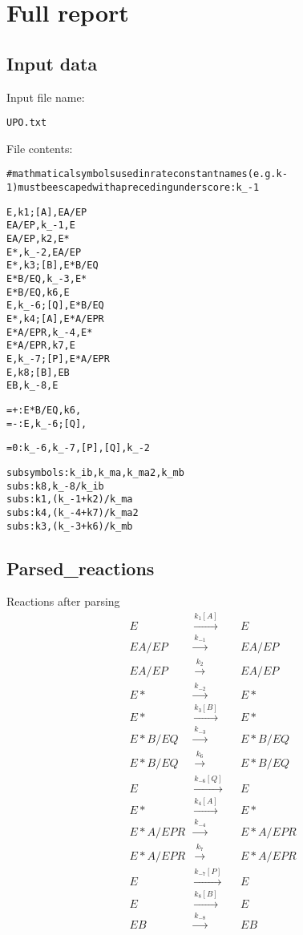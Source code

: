 \documentclass{article}%
\begin{document}
%
\normalsize%
\section{Full report}%
\label{sec:Full report}%
\subsection{Input data}%
\label{subsec:Input data}%
Input file name: %
\begin{alltt}
UPO.txt
\end{alltt}%
File contents:%
\begin{alltt}
#mathmatical symbols used in rate constant names (e.g. k-1) must be escaped with a preceding underscore: k_-1

E, k1; [A], EA/EP
EA/EP, k_-1, E
EA/EP, k2, E*
E*, k_-2, EA/EP
E*, k3; [B], E*B/EQ
E*B/EQ, k_-3, E*
E*B/EQ, k6, E
E, k_-6; [Q], E*B/EQ
E*, k4; [A], E*A/EPR
E*A/EPR, k_-4, E*
E*A/EPR, k7, E
E, k_-7; [P], E*A/EPR
E, k8; [B], EB
EB, k_-8, E

=+: E*B/EQ, k6,
=-: E, k_-6; [Q],

=0: k_-6, k_-7, [P], [Q], k_-2

subsymbols: k_ib, k_ma, k_ma2, k_mb
subs:k8, k_-8/k_ib
subs:k1, (k_-1 + k2)/k_ma
subs:k4, (k_-4+k7)/k_ma2
subs:k3, (k_-3+k6)/k_mb
\end{alltt}

%
\subsection{Parsed\_reactions}%
\label{subsec:Parsedreactions}%
Reactions after parsing \newline%
%
\begin{align*}
&E & \xrightarrow{k_{1}[A]} & &E\\
&EA/EP & \xrightarrow{k_{-1}} & &EA/EP\\
&EA/EP & \xrightarrow{k_{2}} & &EA/EP\\
&E* & \xrightarrow{k_{-2}} & &E*\\
&E* & \xrightarrow{k_{3}[B]} & &E*\\
&E*B/EQ & \xrightarrow{k_{-3}} & &E*B/EQ\\
&E*B/EQ & \xrightarrow{k_{6}} & &E*B/EQ\\
&E & \xrightarrow{k_{-6}[Q]} & &E\\
&E* & \xrightarrow{k_{4}[A]} & &E*\\
&E*A/EPR & \xrightarrow{k_{-4}} & &E*A/EPR\\
&E*A/EPR & \xrightarrow{k_{7}} & &E*A/EPR\\
&E & \xrightarrow{k_{-7}[P]} & &E\\
&E & \xrightarrow{k_{8}[B]} & &E\\
&EB & \xrightarrow{k_{-8}} & &EB\\
\end{align*}

%
\end{document}
